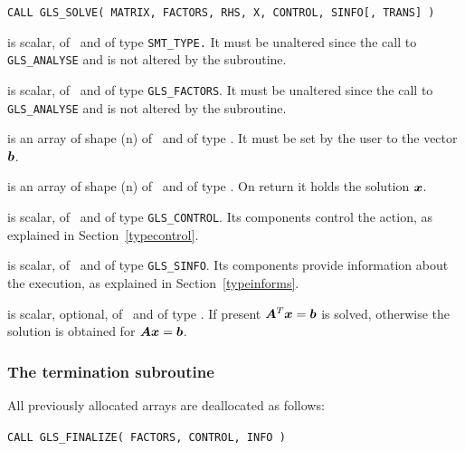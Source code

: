 \documentclass{galahad}
\newcommand{\packagename}{GLS}
\begin{document}
\hspace{8mm}
{\tt CALL \packagename\_SOLVE( MATRIX, FACTORS, RHS, X, CONTROL, 
SINFO[, TRANS] )}

\begin{description}

 is scalar, of \intentin\ and of type {\tt SMT\_TYPE.}  It
must be unaltered since the call to {\tt \packagename\_ANALYSE} and is 
not altered by the subroutine.

 is scalar, of \intentin\ and of type {\tt \packagename\_FACTORS}. 
It must be unaltered since the call to {\tt \packagename\_ANALYSE} and is 
not altered by the subroutine.

 is an array of shape ({n}) of \intentin\ and of type \realdp. 
It must be set by the user to the vector ${\bm{b}}$.

 is an array of shape ({n}) of \intentout\ and of type \realdp. 
On return it holds the solution ${\bm{x}}$.

 is scalar, of \intentin\ and of type {\tt \packagename\_CONTROL}. 
Its components control the action, as explained in 
Section~\ref{typecontrol}.

 is scalar, of \intentout\ and of type {\tt \packagename\_SINFO}.  
Its components provide information about the execution, as explained in
Section~\ref{typeinforms}.

 is scalar, optional, of \intentin\ and of type \integer. 
If present ${\bm{A}}^T {\bm{x}} = {\bm{b}}$ is solved, otherwise the solution
is obtained for ${\bm{A}} {\bm{x}} = {\bm{b}}$.

\end{description}


\subsubsection{The termination subroutine}
All previously allocated arrays are deallocated as follows:

\hspace{8mm}
{\tt CALL \packagename\_FINALIZE( FACTORS, CONTROL, INFO )}
\end{document}
